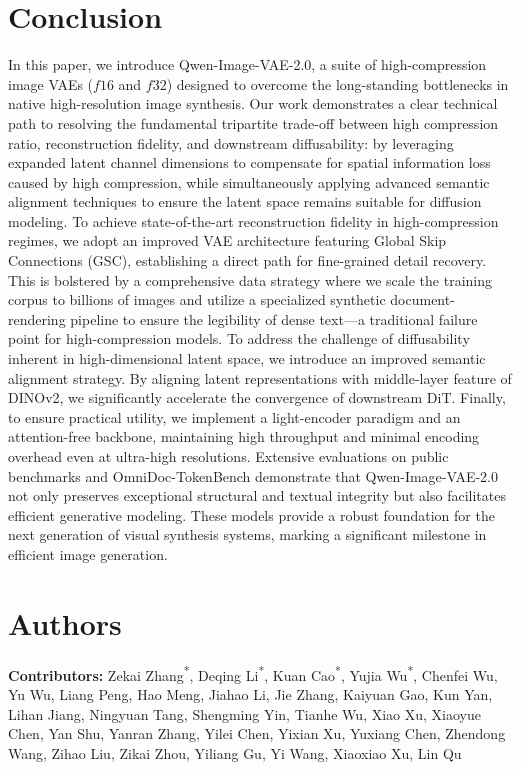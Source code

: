 \documentclass{llmxive}
\providecommand{\thefootnote}{\fnsymbol{footnote}}
\begin{document}
\section{Conclusion}
In this paper, we introduce Qwen-Image-VAE-2.0, a suite of high-compression image VAEs ($f16$ and $f32$) designed to overcome the long-standing bottlenecks in native high-resolution image synthesis. Our work demonstrates a clear technical path to resolving the fundamental tripartite trade-off between high compression ratio, reconstruction fidelity, and downstream diffusability: by leveraging expanded latent channel dimensions to compensate for spatial information loss caused by high compression, while simultaneously applying advanced semantic alignment techniques to ensure the latent space remains suitable for diffusion modeling. To achieve state-of-the-art reconstruction fidelity in high-compression regimes, we adopt an improved VAE architecture featuring Global Skip Connections (GSC), establishing a direct path for fine-grained detail recovery. This is bolstered by a comprehensive data strategy where we scale the training corpus to billions of images and utilize a specialized synthetic document-rendering pipeline to ensure the legibility of dense text—a traditional failure point for high-compression models. To address the challenge of diffusability inherent in high-dimensional latent space, we introduce an improved semantic alignment strategy. By aligning latent representations with middle-layer feature of DINOv2, we significantly accelerate the convergence of downstream DiT. Finally, to ensure practical utility, we implement a light-encoder paradigm and an attention-free backbone, maintaining high throughput and minimal encoding overhead even at ultra-high resolutions. Extensive evaluations on public benchmarks and OmniDoc-TokenBench demonstrate that Qwen-Image-VAE-2.0 not only preserves exceptional structural and textual integrity but also facilitates efficient generative modeling. These models provide a robust foundation for the next generation of visual synthesis systems, marking a significant milestone in efficient image generation.


\section{Authors}

\textbf{Contributors:} Zekai Zhang\textsuperscript{*}, Deqing Li\textsuperscript{*}, Kuan Cao\textsuperscript{*}, Yujia Wu\textsuperscript{*}, Chenfei Wu\textsuperscript{\textdagger}, Yu Wu, Liang Peng, Hao Meng, Jiahao Li, Jie Zhang, Kaiyuan Gao, Kun Yan, Lihan Jiang, Ningyuan Tang, Shengming Yin, Tianhe Wu, Xiao Xu, Xiaoyue Chen, Yan Shu, Yanran Zhang, Yilei Chen, Yixian Xu, Yuxiang Chen, Zhendong Wang, Zihao Liu, Zikai Zhou, Yiliang Gu, Yi Wang, Xiaoxiao Xu, Lin Qu

\begingroup
  \renewcommand\thefootnote{}
  \addtocounter{footnote}{-1}
\endgroup




\end{document}
